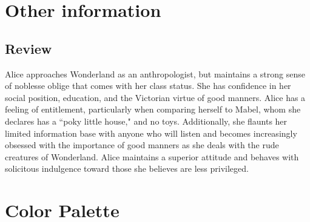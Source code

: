 \documentclass[letterpaper]{twentysecondcv} %
\begin{document}
\section{Other information}

\subsection{Review}

Alice approaches Wonderland as an anthropologist, but maintains a strong sense of noblesse oblige that comes with her class status. She has confidence in her social position, education, and the Victorian virtue of good manners. Alice has a feeling of entitlement, particularly when comparing herself to Mabel, whom she declares has a ``poky little house," and no toys. Additionally, she flaunts her limited information base with anyone who will listen and becomes increasingly obsessed with the importance of good manners as she deals with the rude creatures of Wonderland. Alice maintains a superior attitude and behaves with solicitous indulgence toward those she believes are less privileged.

\section{Color Palette}
\drawpalette

\end{document}
